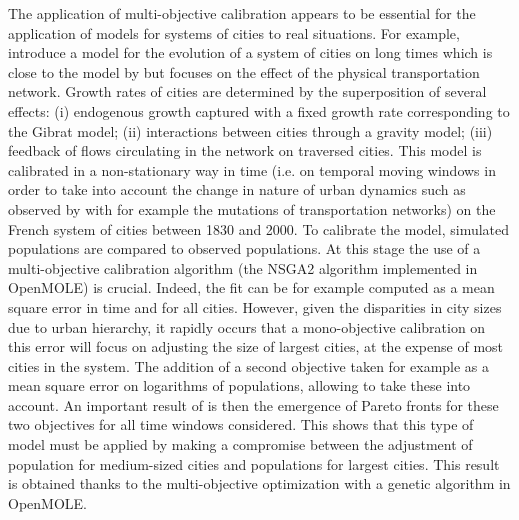 \documentclass[10pt]{article}
\begin{document}
The application of multi-objective calibration appears to be essential for the application of models for systems of cities to real situations. For example, \cite{raimbault2018indirect} introduce a model for the evolution of a system of cities on long times which is close to the model by \citep{favaro2011gibrat} but focuses on the effect of the physical transportation network. Growth rates of cities are determined by the superposition of several effects: (i) endogenous growth captured with a fixed growth rate corresponding to the Gibrat model; (ii) interactions between cities through a gravity model; (iii) feedback of flows circulating in the network on traversed cities. This model is calibrated in a non-stationary way in time (i.e. on temporal moving windows in order to take into account the change in nature of urban dynamics such as observed by \cite{bretagnolle2018vers} with for example the mutations of transportation networks) on the French system of cities between 1830 and 2000. To calibrate the model, simulated populations are compared to observed populations. At this stage the use of a multi-objective calibration algorithm (the NSGA2 algorithm implemented in OpenMOLE) is crucial. Indeed, the fit can be for example computed as a mean square error in time and for all cities. However, given the disparities in city sizes due to urban hierarchy, it rapidly occurs that a mono-objective calibration on this error will focus on adjusting the size of largest cities, at the expense of most cities in the system. The addition of a second objective taken for example as a mean square error on logarithms of populations, allowing to take these into account. An important result of \citep{raimbault2018indirect} is then the emergence of Pareto fronts for these two objectives for all time windows considered. This shows that this type of model must be applied by making a compromise between the adjustment of population for medium-sized cities and populations for largest cities. This result is obtained thanks to the multi-objective optimization with a genetic algorithm in OpenMOLE.
\end{document}
